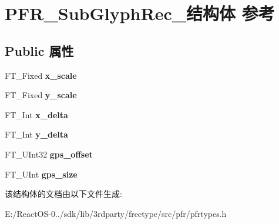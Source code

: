 \hypertarget{struct_p_f_r___sub_glyph_rec__}{}\section{P\+F\+R\+\_\+\+Sub\+Glyph\+Rec\+\_\+结构体 参考}
\label{struct_p_f_r___sub_glyph_rec__}
\subsection*{Public 属性}
\begin{DoxyCompactItemize}
\item 
\mbox{\label{struct_p_f_r___sub_glyph_rec___a0705bd25fd087e9ed789cb7aa023a461}} 
F\+T\+\_\+\+Fixed {\bfseries x\+\_\+scale}
\item 
\mbox{\label{struct_p_f_r___sub_glyph_rec___adc001eecbb94f40702eff3877d9f95a1}} 
F\+T\+\_\+\+Fixed {\bfseries y\+\_\+scale}
\item 
\mbox{\label{struct_p_f_r___sub_glyph_rec___a968d795ded4fc981d37f3f7da19db20b}} 
F\+T\+\_\+\+Int {\bfseries x\+\_\+delta}
\item 
\mbox{\label{struct_p_f_r___sub_glyph_rec___a246fbf19ed6e3b86870aad64ea186f80}} 
F\+T\+\_\+\+Int {\bfseries y\+\_\+delta}
\item 
\mbox{\label{struct_p_f_r___sub_glyph_rec___a4c593d934510582b6911dcd80965e3e2}} 
F\+T\+\_\+\+U\+Int32 {\bfseries gps\+\_\+offset}
\item 
\mbox{\label{struct_p_f_r___sub_glyph_rec___aa78217e910da51566e653b7ea0dca490}} 
F\+T\+\_\+\+U\+Int {\bfseries gps\+\_\+size}
\end{DoxyCompactItemize}


该结构体的文档由以下文件生成\+:\begin{DoxyCompactItemize}
\item 
E\+:/\+React\+O\+S-\/0../sdk/lib/3rdparty/freetype/src/pfr/pfrtypes.\+h\end{DoxyCompactItemize}
